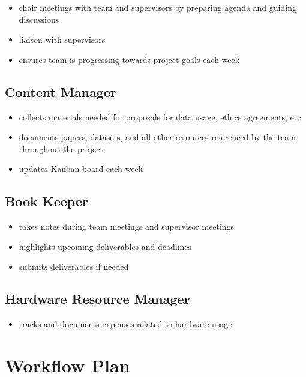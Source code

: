 \documentclass{article}
\begin{document}
\begin{itemize}
  \item chair meetings with team and supervisors by preparing agenda and guiding discussions
  \item liaison with supervisors
  \item ensures team is progressing towards project goals each week
\end{itemize}

\subsection{Content Manager}

\begin{itemize}
  \item collects materials needed for proposals for data usage, ethics agreements, etc
  \item documents papers, datasets, and all other resources referenced by the team throughout the project
  \item updates Kanban board each week
\end{itemize}

\subsection{Book Keeper}

\begin{itemize}
  \item takes notes during team meetings and supervisor meetings
  \item highlights upcoming deliverables and deadlines
  \item submits deliverables if needed
\end{itemize}

\subsection{Hardware Resource Manager }

\begin{itemize}
  \item tracks and documents expenses related to hardware usage
\end{itemize}


\section{Workflow Plan}

  \begin{comment}
	\item How will you be using git, including branches, pull request, etc.?
	\item How will you be managing issues, including template issues, issue
	classification, etc.?
  \item Use of CI/CD
  \item 
\end{comment}
  
\end{document}
